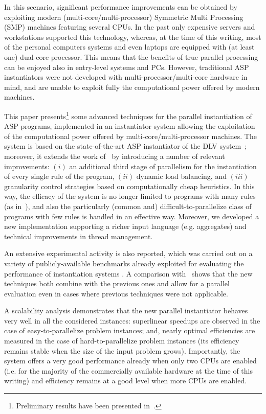 \documentclass[preprint]{tlp}
\newcommand{\dlv}{{\sc DLV}\xspace}
\begin{document}
In this scenario, significant performance improvements can be obtained
by exploiting modern (multi-core/multi-processor) Symmetric Multi Processing (SMP) \cite{stall-98} machines
featuring several CPUs.
In the past only expensive servers and workstations supported this technology, whereas,
at the time of this writing, most of the personal computers systems
and even laptops are equipped with (at least one) dual-core processor.
This means that the benefits of true parallel processing can
be enjoyed also in entry-level systems and PCs.
However, traditional ASP instantiators were not developed with
multi-processor/multi-core hardware in mind, and are unable to
exploit fully the computational power offered by modern machines.

This paper presents\footnote{Preliminary results have been presented in~\cite{perr-etal-2008,perr-etal-2010-damp}.}
some advanced techniques for the parallel instantiation
of ASP programs, implemented in an instantiator system allowing the exploitation of the computational power
offered by multi-core/multi-processor machines.
The system is based on the state-of-the-art ASP instantiator
of the \dlv system~\cite{leon-etal-2002-dlv}; moreover, it
extends the work of~\cite{cali-etal-2008-joacil}
 by introducing a number of relevant improvements:
$(i)$ an additional third stage of parallelism for the instantiation of every single rule of the program,
$(ii)$ dynamic load balancing, and $(iii)$ granularity control strategies
based on computationally cheap heuristics.
In this way, the efficacy of the system is no longer limited to programs with
many rules (as in~\cite{cali-etal-2008-joacil}), and also  the particularly
(common and) difficult-to-parallelize class of programs with few rules
is handled in an effective way.
Moreover, we developed a new implementation supporting a richer input language (e.g. aggregates)
and technical improvements in thread management.

An extensive experimental activity is also reported, which was carried out on a variety
of publicly-available benchmarks already exploited for evaluating the performance of instantiation systems \cite{gebs-etal-2007-lpnmr-competition,devebogetr09a,leon-etal-2002-dlv}.
A comparison with~\cite{cali-etal-2008-joacil} shows that the new techniques
both combine with the previous ones and allow for a parallel evaluation
even in cases where previous techniques were not applicable.


A scalability analysis demonstrates that the new parallel instantiator behaves very well in all the considered
instances: superlinear speedups are observed in the case of easy-to-parallelize problem instances; and,
nearly optimal efficiencies are measured in the case of hard-to-parallelize problem instances
(its efficiency remains stable when the size of the input problem grows).
Importantly, the system offers a very good performance already when only two CPUs are enabled
(i.e. for the majority of the commercially available hardware at the time of this writing)
and efficiency remains at a good level when more CPUs are enabled.
\end{document}
